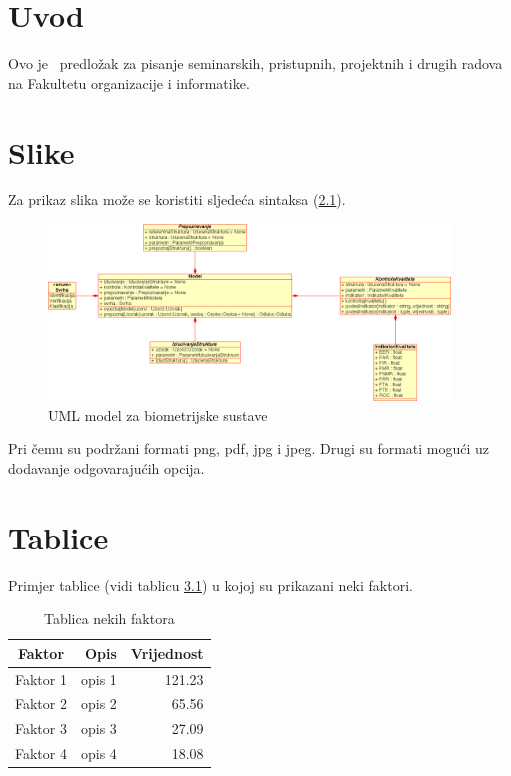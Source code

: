 \documentclass[a4paper,12pt]{foi}
\begin{document}
	
\maketitle
\tableofcontents
\thispagestyle{empty}
\setcounter{page}{0}
\onehalfspacing

\chapter{Uvod}

Ovo je \LaTeXe\ predlo\v{z}ak za pisanje seminarskih, pristupnih, projektnih i drugih radova na Fakultetu organizacije i informatike.


\chapter{Slike}

Za prikaz slika mo\v{z}e se koristiti sljede\'{c}a sintaksa (\ref{slika-1}).

\begin{figure}[h]
\centering 
\includegraphics[width=0.95\textwidth]{model.png}
\caption{UML model za biometrijske sustave \citep{Schatten2008}}
\label{slika-1}
\end{figure}

Pri \v{c}emu su podr\v{z}ani formati png, pdf, jpg i jpeg. Drugi su formati mogu\'{c}i uz dodavanje odgovaraju\'{c}ih opcija.

\chapter{Tablice}

Primjer tablice (vidi tablicu \ref{tablica-1}) u kojoj su prikazani neki faktori.


\begin{table}[h]
\caption{Tablica nekih faktora}
\begin{center}
\begin{tabular}{||c|r|r||}
\hline
\textbf{Faktor}&\textbf{Opis}&\textbf{Vrijednost} \\
\hline
Faktor 1&opis 1&121.23 \\
Faktor 2&opis 2&65.56 \\
Faktor 3&opis 3&27.09 \\
Faktor 4&opis 4&18.08 \\
\hline
\end{tabular}
\end{center}
\label{tablica-1}
\end{table}
\end{document}

